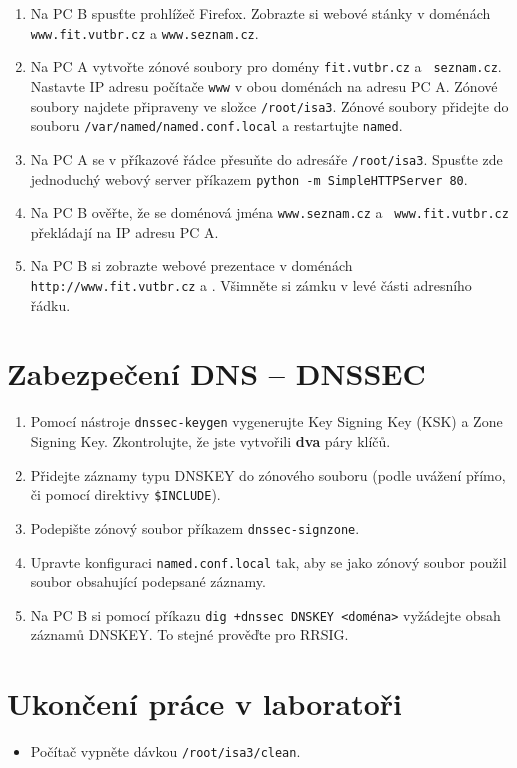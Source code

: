 \begin{enumerate}
  \item Na PC B spusťte prohlížeč Firefox. Zobrazte si webové stánky v
    doménách {\tt www.fit.vutbr.cz} a {\tt www.seznam.cz}.

  \item Na PC A vytvořte zónové soubory pro domény {\tt fit.vutbr.cz} a {\tt
    seznam.cz}. Nastavte IP adresu počítače {\tt www} v obou doménách na adresu
    PC A. Zónové soubory najdete připraveny ve složce {\tt /root/isa3}. Zónové
    soubory přidejte do souboru {\tt /var/named/named.conf.local} a restartujte
    {\tt named}.

  \item Na PC A se v příkazové řádce přesuňte do adresáře {\tt /root/isa3}.
    Spusťte zde jednoduchý webový server příkazem {\tt python -m
    SimpleHTTPServer 80}.

  \item Na PC B ověřte, že se doménová jména {\tt www.seznam.cz} a {\tt
    www.fit.vutbr.cz} překládají na IP adresu PC A.

  \item Na PC B si zobrazte webové prezentace v doménách {\tt http://www.fit.vutbr.cz}
    a . Všimněte si zámku v levé části adresního řádku.

\end{enumerate}

\section{Zabezpečení DNS -- DNSSEC}

\begin{enumerate}

  \item Pomocí nástroje {\tt dnssec-keygen} vygenerujte Key Signing Key (KSK) a Zone Signing Key. Zkontrolujte, že
    jste vytvořili \textbf{dva} páry klíčů.

  \item Přidejte záznamy typu DNSKEY do zónového souboru (podle uvážení přímo,
    či pomocí direktivy \verb|$INCLUDE|).

  \item Podepište zónový soubor příkazem {\tt dnssec-signzone}.

  \item Upravte konfiguraci {\tt named.conf.local} tak, aby se jako zónový
    soubor použil soubor obsahující podepsané záznamy.

  \item Na PC B si pomocí příkazu {\tt dig +dnssec DNSKEY <doména>} vyžádejte obsah záznamů
    DNSKEY. To stejné prověďte pro RRSIG.

\end{enumerate}


\section{Ukončení práce v laboratoři}
\begin{itemize}
  \item Počítač vypněte dávkou {\tt /root/isa3/clean}.
\end{itemize}
